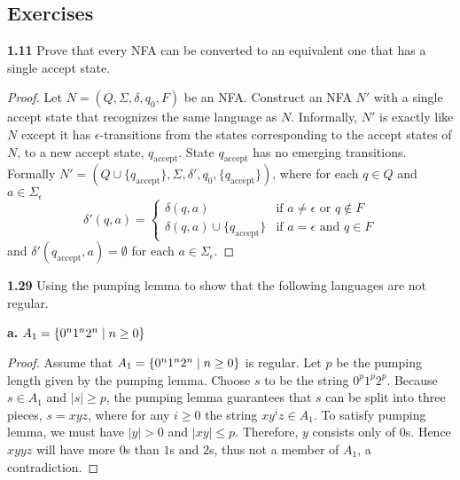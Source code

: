 \subsection{Exercises}
\textbf{1.11} Prove that every NFA can be converted to an equivalent one that has a single accept state.

\begin{mdframed}
\begin{proof}
Let $N = (Q, \Sigma, \delta, q_0, F)$ be an NFA. Construct an NFA $N'$ with a single accept state that recognizes the same language as $N$. Informally, $N'$ is exactly like $N$ except it has $\epsilon$-transitions from the states corresponding to the accept states of $N$, to a new accept state, $q_\text{accept}$. State $q_\text{accept}$ has no emerging transitions. Formally $N' = (Q\cup \{q_\text{accept}\}, \Sigma, \delta', q_0, \{q_\text{accept}\})$, where for each $q\in Q$ and $a \in \Sigma_\epsilon$
\[
\delta'(q, a) = \begin{cases}
\delta(q, a) & \text{if $a \neq \epsilon$ or $q \not \in F$}\\
\delta(q, a) \cup \{q_\text{accept}\} & \text{if $a = \epsilon$ and $q \in F$}
\end{cases}
\]
and $\delta'(q_\text{accept}, a) = \emptyset$ for each $a \in \Sigma_\epsilon$.
\end{proof}
\end{mdframed}

\textbf{1.29} Using the pumping lemma to show that the following languages are not regular.

\textbf{a.} $A_1 = \{{0^n 1^n 2^n \mid n \geq 0}\}$
\begin{mdframed}
\begin{proof}
Assume that $A_1 = \{{0^n 1^n 2^n \mid n \geq 0}\}$ is regular. Let $p$ be the pumping length given by the pumping lemma. Choose $s$ to be the string $0^p 1^p 2^p$. Because $s \in A_1$ and $|s| \geq p$, the pumping lemma guarantees that $s$ can be split into three pieces, $s = xyz$, where for any $i\geq 0$ the string $xy^iz \in A_1$. To satisfy pumping lemma, we must have $|y| > 0$ and $|xy| \leq p$. Therefore, $y$ consists only of $0$s. Hence $xyyz$ will have more $0$s than $1$s and $2$s, thus not a member of $A_1$, a contradiction.
\end{proof}
\end{mdframed}

